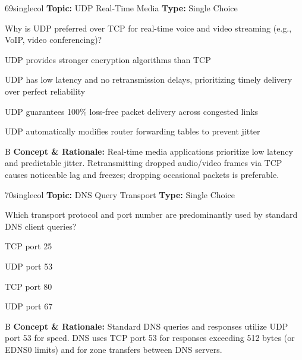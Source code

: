 \begin{qcard}{69}{singlecol}
\textcolor{darkslate!75}{\small\textbf{Topic:} UDP Real-Time Media \hfill \textbf{Type:} Single Choice}\vspace{0.4em}\par
Why is UDP preferred over TCP for real-time voice and video streaming (e.g., VoIP, video conferencing)?
\begin{qoptions}
\item UDP provides stronger encryption algorithms than TCP
\item UDP has low latency and no retransmission delays, prioritizing timely delivery over perfect reliability
\item UDP guarantees 100\% loss-free packet delivery across congested links
\item UDP automatically modifies router forwarding tables to prevent jitter
\end{qoptions}
\end{qcard}
\nopagebreak
\begin{explainbox}{B}
\textbf{Concept \& Rationale:} Real-time media applications prioritize low latency and predictable jitter. Retransmitting dropped audio/video frames via TCP causes noticeable lag and freezes; dropping occasional packets is preferable.
\end{explainbox}

\begin{qcard}{70}{singlecol}
\textcolor{darkslate!75}{\small\textbf{Topic:} DNS Query Transport \hfill \textbf{Type:} Single Choice}\vspace{0.4em}\par
Which transport protocol and port number are predominantly used by standard DNS client queries?
\begin{qoptions}
\item TCP port 25
\item UDP port 53
\item TCP port 80
\item UDP port 67
\end{qoptions}
\end{qcard}
\nopagebreak
\begin{explainbox}{B}
\textbf{Concept \& Rationale:} Standard DNS queries and responses utilize UDP port 53 for speed. DNS uses TCP port 53 for responses exceeding 512 bytes (or EDNS0 limits) and for zone transfers between DNS servers.
\end{explainbox}


